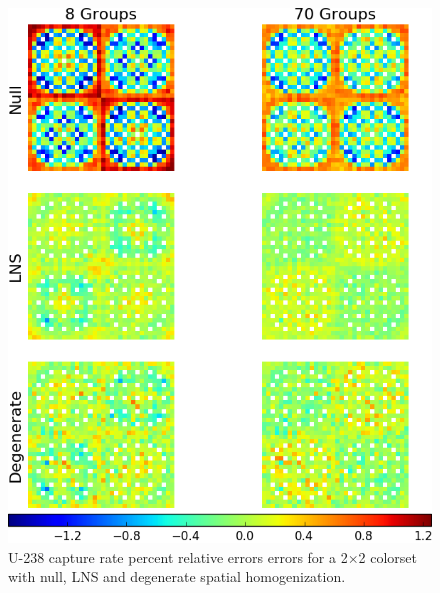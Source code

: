 \begin{figure}[h!]
\centering
\includegraphics[width=\linewidth]{figures/patterns/lns/2x2/capt-err}
\vspace{2mm}
\caption[U-238 capture rate errors for a 2$\times$2 colorset]{U-238 capture rate percent relative errors errors for a 2$\times$2 colorset with null, \ac{LNS} and degenerate spatial homogenization.}
\label{fig:chap9-2x2-lns-capt-err}
\end{figure}

\clearpage


